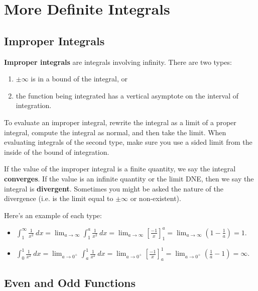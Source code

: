 \section{More Definite Integrals}

\subsection{Improper Integrals}

\textbf{Improper integrals} are integrals involving infinity. There are two types:
\begin{enumerate}
    \item $\pm\infty$ is in a bound of the integral, or
    \item the function being integrated has a vertical asymptote on the interval of integration.
\end{enumerate}


To evaluate an improper integral, rewrite the integral as a limit of a proper integral, compute the integral as normal, and then take the limit. When evaluating integrals of the second type, make sure you use a sided limit from the inside of the bound of integration.

If the value of the improper integral is a finite quantity, we say the integral \textbf{converges}. If the value is an infinite quantity or the limit DNE, then we say the integral is \textbf{divergent}. Sometimes you might be asked the nature of the divergence (i.e. is the limit equal to $\pm\infty$ or non-existent).

Here's an example of each type:

\begin{itemize}%
    \item $\displaystyle \int_1^\infty \frac{1}{x^2}\ dx
     = \lim_{a\to \infty}\int_1^a \frac{1}{x^2}\ dx 
     = \lim_{a\to \infty}\left[\frac{-1}{x}\right]_1^a 
     = \lim_{a\to \infty} \left(1-\frac{1}{a}\right)
    =1.$
    \item $\displaystyle\int_{0}^{1}\frac{1}{x^{2}}\ dx 
     = \lim_{a\to 0^+} \int_{a}^{1}\frac{1}{x^{2}}\ dx 
     = \lim_{a\to 0^+}\left[\frac{-1}{x}\right]_a^1 
     = \lim_{a\to 0^+}\left(\frac{1}{a}-1\right)
     = \infty.$
\end{itemize}




\subsection{Even and Odd Functions}


